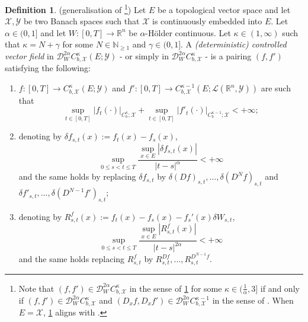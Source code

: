 \documentclass[10pt, a4paper]{article} %
\newcommand{\R}{\mathbb{R}}
\theoremstyle{definition}
\newtheorem{defn}{Definition}[section]
\theoremstyle{plain}
\begin{document}
\begin{defn} \label{def:stochasticcontrolledvectorfield}
    (generalisation of \cite[Definition 3.4]{FHL25} \footnote{Note that $(f,f') \in \mathscr{D}_W^{2\alpha}C^\kappa_{b,\mathcal{X}}$ in the sense of \cref{def:stochasticcontrolledvectorfield} for some $\kappa \in (\frac{1}{\alpha},3]$ if and only if $(f,f') \in \mathscr{D}_W^{2\alpha}C^\kappa_{b,\mathcal{X}}$ and $(D_xf, D_x f') \in \mathscr{D}_W^{2\alpha}C^{\kappa-1}_{b,\mathcal{X}}$ in the sense of \cite[Definition 3.4]{FHL25}. When $E = \mathcal{X}$, \cref{def:stochasticcontrolledvectorfield} aligns with \cite[Definition 2.3]{BFS24}.})
    Let $E$ be a topological vector space and let $\mathcal{X}, \mathcal{Y}$ be two Banach spaces such that {$\mathcal{X}$ is continuously embedded into $E$}. 
    Let $\alpha \in (0,1]$ and let $W:[0,T] \to \R^n$ be $\alpha$-H\"older continuous. 
    Let $\kappa \in (1,\infty)$ such that $\kappa = N + \gamma$ for some $N \in \mathbb{N}_{\ge 1}$ and $\gamma \in (0,1]$. 
    A \textit{(deterministic) controlled vector field} in $\mathscr{D}_W^{2\alpha}C_{b,\mathcal{X}}^\kappa(E;\mathcal{Y})$
    - or simply in $\mathscr{D}_W^{2\alpha}C_{b,\mathcal{X}}^\kappa$
    - is a pairing $(f,f')$ satisfying the following: \begin{enumerate}  \renewcommand{\labelenumi}{\roman{enumi})}
        \item $f: [0,T] \to C^\kappa_{b,\mathcal{X}}(E;\mathcal{Y})$ and $f': [0,T] \to C^{\kappa-1}_{b,\mathcal{X}}(E;\mathscr{L}(\R^n,\mathcal{Y}))$ are %
        such that
        \begin{equation*}
            \sup_{t \in [0,T]}  |f_t(\cdot)|_{C_b^\kappa;\mathcal{X}}  + \sup_{t \in [0,T]}  |f'_t(\cdot)|_{C_b^{\kappa-1};\mathcal{X}}  < +\infty;
        \end{equation*}
        \item denoting by $\delta f_{s,t}(x) := f_t(x) - f_s(x)$,  \begin{equation*}
            \sup_{0 \le s < t \le T} \frac{ \sup_{x \in E}|\delta f_{s,t} (x)|}{|t-s|^\alpha} < +\infty
        \end{equation*}
        and the same holds by replacing $\delta f_{s,t}$ by {$\delta (D f)_{s,t}, \dots , \delta (D^N f)_{s,t}$ and $ \delta f'_{s,t}, \dots, \delta (D^{N-1} f')_{s,t}$};
        \item denoting by $R^f_{s,t}(x) := f_t(x) - f_s(x) - f_s'(x) \delta W_{s,t}$,
        \begin{equation*}
            \sup_{0 \le s < t \le T} \frac{ \sup_{x \in E}|R^f_{s,t} (x) |}{|t-s|^{2\alpha}} < +\infty
        \end{equation*}
        and the same holds replacing $R^f_{s,t}$ by $R^{Df}_{s,t}, \dots, R^{D^{N-1}f}_{s,t}$.
    \end{enumerate}
\end{defn}
\end{document}
